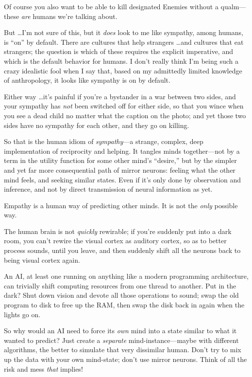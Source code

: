{
 Of course you also want to be able to kill designated Enemies
without a qualm---these \textit{are} humans we're
talking about.}

{
 But \ldots I'm not sure of this, but it
\textit{does} look to me like sympathy, among humans, is
``on'' by default. There are
cultures that help strangers \ldots and cultures that eat strangers; the
question is which of these requires the explicit imperative, and which
is the default behavior for humans. I don't really
think I'm being such a crazy idealistic fool when I say
that, based on my admittedly limited knowledge of anthropology, it
looks like sympathy is on by default.}

{
 Either way \ldots it's painful if
you're a bystander in a war between two sides, and your
sympathy has \textit{not} been switched off for either side, so that
you wince when you see a dead child no matter what the caption on the
photo; and yet those two sides have no sympathy for each other, and
they go on killing.}

{
 So that is the human idiom of \textit{sympathy}{}---a strange,
complex, deep implementation of reciprocity and helping. It tangles
minds together---not by a term in the utility function for some other
mind's ``desire,''
but by the simpler and yet far more consequential path of mirror
neurons: feeling what the other mind feels, and seeking similar states.
Even if it's only done by observation and inference,
and not by direct transmission of neural information as yet.}

{
 Empathy is a human way of predicting other minds. It is not the
\textit{only} possible way.}

{
 The human brain is not \textit{quickly} rewirable; if
you're suddenly put into a dark room, you
can't rewire the visual cortex as auditory cortex, so
as to better process sounds, until you leave, and then suddenly shift
all the neurons back to being visual cortex again.}

{
 An AI, at least one running on anything like a modern programming
architecture, can trivially shift computing resources from one thread
to another. Put in the dark? Shut down vision and devote all those
operations to sound; swap the old program to disk to free up the RAM,
then swap the disk back in again when the lights go on.}

{
 So why would an AI need to force its \textit{own} mind into a
state similar to what it wanted to predict? Just create a
\textit{separate} mind-instance---maybe with different algorithms, the
better to simulate that very dissimilar human. Don't
try to mix up the data with your own mind-state; don't
use mirror neurons. Think of all the risk and mess \textit{that}
implies!}

